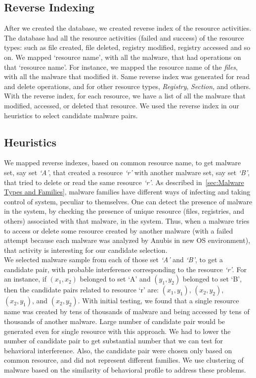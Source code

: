 \subsection{Reverse Indexing}
\label{sub:Reverse Indexing}
After we created the database, we created reverse index of the resource activities.
The database had all the resource activities (failed and success) of the resource types: such as file created, file deleted, registry modified, registry accessed and so on.
We mapped `resource name', with all the malware, that had operations on that `resource name'.
For instance, we mapped the resource name of the \emph{files}, with all the malware that modified it.
Same reverse index was generated for read and delete operations, and for other resource types, \emph{Registry}, \emph{Section}, and others.
With the reverse index, for each resource, we have a list of all the malware that modified, accessed, or deleted that resource.
We used the reverse index in our heuristics to select candidate malware pairs.
\subsection{Heuristics}
\label{sub:Heuristics}
We mapped reverse indexes, based on common resource name, to get malware set, say set \emph{`A'}, that created a resource \emph{`r'} with another malware set, say set \emph{`B'}, that tried to delete or read the same resource \emph{`r'}.
As described in~\autoref{sec:Malware Types and Families}, malware families have different ways of infecting and taking control of system, peculiar to themselves.
One can detect the presence of malware in the system, by checking the presence of unique resource (files, registries, and others) associated with that malware, in the system.
Thus, when a malware tries to access or delete some resource created by another malware (with a failed attempt because each malware was analyzed by Anubis in new OS environment), that activity is interesting for our candidate selection.\\

We selected malware sample from each of those set \emph{`A'} and \emph{`B'}, to get a candidate pair, with probable interference corresponding to the resource \emph{`r'}.
For an instance, if $(x_1,x_2)$ belonged to set `A' and $(y_1,y_2)$ belonged to set `B', then the candidate pairs related to resource `r' are: $(x_1,y_1)$, $(x_2,y_2)$, $(x_2,y_1)$, and $(x_2,y_2)$.
With initial testing, we found that a single resource name was created by tens of thousands of malware and being accessed by tens of thousands of another malware.
Large number of candidate pair would be generated even for single resource with this approach.
We had to lower the number of candidate pair to get substantial number that we can test for behavioral interference.
Also, the candidate pair were chosen only based on common resource, and did not represent different families.
We use clustering of malware based on the similarity of behavioral profile to address these problems.
